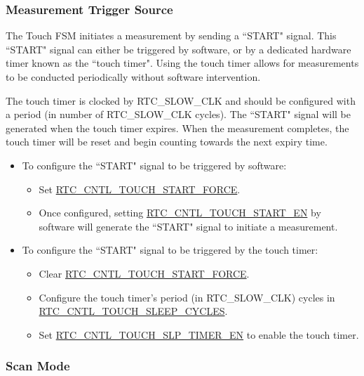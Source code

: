 \documentclass[main\_\_EN.tex]{subfiles}
\begin{document}
\subsubsection{Measurement Trigger Source}

The Touch FSM initiates a measurement by sending a ``START" signal. This ``START" signal can either be triggered by software, or by a dedicated hardware timer known as the ``touch timer". Using the touch timer allows for measurements to be conducted periodically without software intervention.

The touch timer is clocked by RTC\_SLOW\_CLK and should be configured with a period (in number of RTC\_SLOW\_CLK cycles). The ``START" signal will be generated when the touch timer expires. When the measurement completes, the touch timer will be reset and begin counting towards the next expiry time.

\begin{itemize}
    \item To configure the ``START" signal to be triggered by software:
    \begin{itemize}
        \item Set \hyperref[fielddesc:RTCCNTLTOUCHSTARTFORCE]{RTC\_CNTL\_TOUCH\_START\_FORCE}.
        \item Once configured, setting \hyperref[fielddesc:RTCCNTLTOUCHSTARTEN]{RTC\_CNTL\_TOUCH\_START\_EN} by software will generate the ``START" signal to initiate a measurement.
         \end{itemize}

\item To configure the ``START" signal to be triggered by the touch timer:
\begin{itemize}
        \item Clear \hyperref[fielddesc:RTCCNTLTOUCHSTARTFORCE]{RTC\_CNTL\_TOUCH\_START\_FORCE}.
        \item Configure the touch timer's period (in RTC\_SLOW\_CLK) cycles in \hyperref[fielddesc:RTCCNTLTOUCHSLEEPCYCLES]{RTC\_CNTL\_TOUCH\_SLEEP\_CYCLES}.
        \item Set \hyperref[fielddesc:RTCCNTLTOUCHSLPTIMEREN]{RTC\_CNTL\_TOUCH\_SLP\_TIMER\_EN} to enable the touch timer.
    \end{itemize}
\end{itemize}

\subsubsection{Scan Mode}
\end{document}
